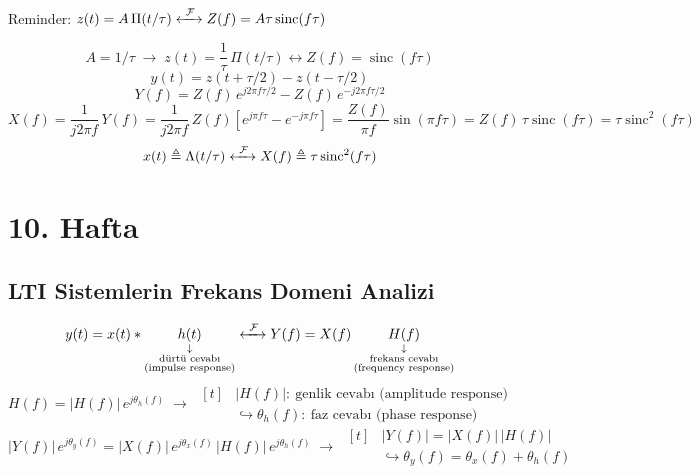 \documentclass[11pt,a4paper]{article}
\begin{document}
\noindent
\begin{minipage}[c]{0.68\linewidth}
Reminder: \quad $z(t)=A\,\Pi(t/\tau) \xleftrightarrow{\ \mathcal{F}\ } Z(f)=A\tau\operatorname{sinc}(f\tau)$
\end{minipage}\hfill
\begin{minipage}[c]{0.3\linewidth}
\centering
{}
\end{minipage}
\[ A=1/\tau \;\longrightarrow\; z(t)=\frac{1}{\tau}\,\Pi(t/\tau) \longleftrightarrow Z(f)=\operatorname{sinc}(f\tau) \]
\[ y(t)=z(t+\tau/2)-z(t-\tau/2) \]
\[ Y(f)=Z(f)\,e^{j2\pi f\tau/2}-Z(f)\,e^{-j2\pi f\tau/2} \]
\[ X(f)=\frac{1}{j2\pi f}\,Y(f)=\frac{1}{j2\pi f}\,Z(f)\left[e^{j\pi f\tau}-e^{-j\pi f\tau}\right]=\frac{Z(f)}{\pi f}\sin(\pi f\tau)=Z(f)\,\tau\operatorname{sinc}(f\tau)=\tau\operatorname{sinc}^2(f\tau) \]
\[ x(t)\triangleq\Lambda(t/\tau) \xleftrightarrow{\ \mathcal{F}\ } X(f)\triangleq\tau\operatorname{sinc}^2(f\tau) \]

\section{10. Hafta}
\subsection{LTI Sistemlerin Frekans Domeni Analizi}
\begin{center}
\end{center}
\[ y(t)=x(t)*\underset{\substack{\downarrow\\ \text{dürtü cevabı}\\ \text{(impulse response)}}}{h(t)} \xleftrightarrow{\ \mathcal{F}\ } Y(f)=X(f)\,\underset{\substack{\downarrow\\ \text{frekans cevabı}\\ \text{(frequency response)}}}{H(f)} \]
\[ H(f)=|H(f)|\,e^{j\theta_h(f)} \;\longrightarrow\; \begin{aligned}[t] &|H(f)|:\ \text{genlik cevabı (amplitude response)}\\ &\hookrightarrow \theta_h(f):\ \text{faz cevabı (phase response)}\end{aligned} \]
\[ |Y(f)|\,e^{j\theta_y(f)}=|X(f)|\,e^{j\theta_x(f)}\,|H(f)|\,e^{j\theta_h(f)} \;\longrightarrow\; \begin{aligned}[t] &|Y(f)|=|X(f)|\,|H(f)|\\ &\hookrightarrow \theta_y(f)=\theta_x(f)+\theta_h(f)\end{aligned} \]
\end{document}
